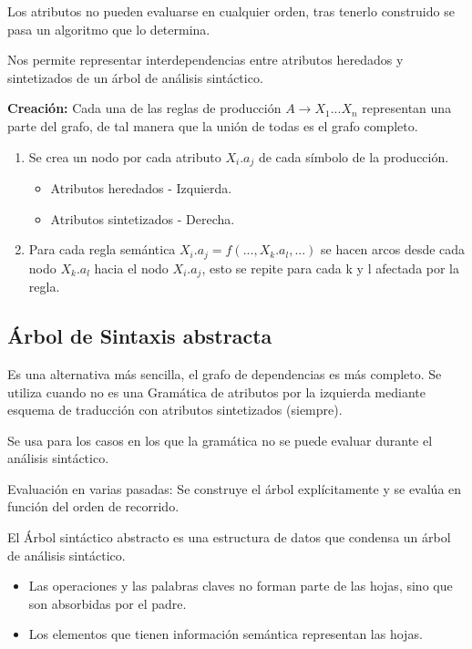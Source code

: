 \documentclass[12pt, twoside, openright]{report} %
\begin{document}
Los atributos no pueden evaluarse en cualquier orden, tras tenerlo construido se pasa un algoritmo que lo determina.

Nos permite representar interdependencias entre atributos heredados y sintetizados de un árbol de análisis sintáctico.

\begin{figure}[H]
	{\def\svgwidth{.9\textwidth}
		}
\end{figure}

\textbf{Creación:} Cada una de las reglas de producción $A \rightarrow X_1 ... X_n$ representan una parte del grafo, de tal manera que la unión de todas es el grafo completo.
\begin{enumerate}
	\item Se crea un nodo por cada atributo $X_i.a_j$ de cada símbolo de la producción.
	      \begin{itemize}
		      \item Atributos heredados - Izquierda.
		      \item Atributos sintetizados - Derecha.
	      \end{itemize}
	\item Para cada regla semántica $X_i.a_j = f(...,X_k.a_l, ...)$ se hacen arcos desde cada nodo $X_k.a_l$ hacia el nodo $X_i.a_j$, esto se repite para cada k y l afectada por la regla.
\end{enumerate}
\pagebreak
\subsection{Árbol de Sintaxis abstracta}
Es una alternativa más sencilla, el grafo de dependencias es más completo. Se utiliza cuando no es una Gramática de atributos por la izquierda mediante esquema de traducción con atributos sintetizados (siempre).

Se usa para los casos en los que la gramática no se puede evaluar durante el análisis sintáctico.

Evaluación en varias pasadas: Se construye el árbol explícitamente y se evalúa en función del orden de recorrido.

\begin{figure}[H]
	{\def\svgwidth{.8\textwidth}
		}
\end{figure}

El Árbol sintáctico abstracto es una estructura de datos que condensa un árbol de análisis sintáctico.
\begin{itemize}
	\item Las operaciones y las palabras claves no forman parte de las hojas, sino que son absorbidas por el padre.
	\item Los elementos que tienen información semántica representan las hojas.
\end{itemize}
\end{document}
